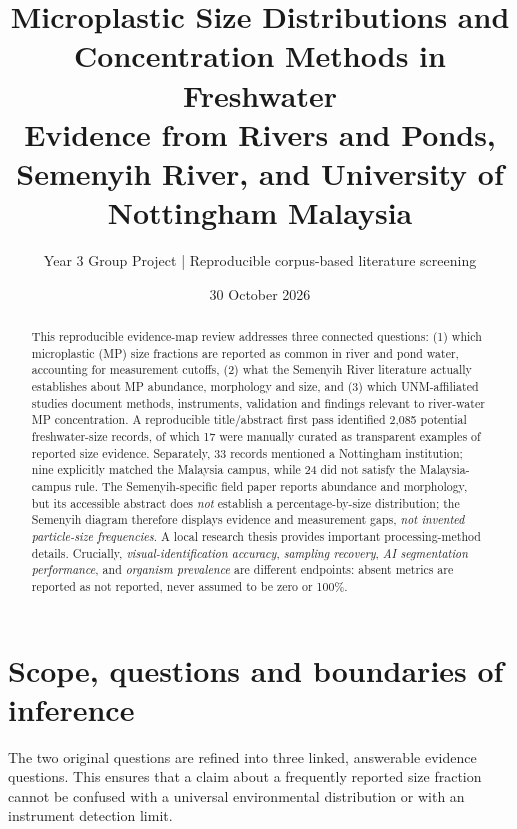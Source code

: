 \documentclass[10pt,a4paper]{article}
\title{\bfseries Microplastic Size Distributions and Concentration Methods in Freshwater\\[3mm]
\large Evidence from Rivers and Ponds, Semenyih River, and University of Nottingham Malaysia}
\author{Year 3 Group Project \quad | \quad Reproducible corpus-based literature screening}
\date{30 October 2026}
\begin{document}
\maketitle
\begin{abstract}
This reproducible evidence-map review addresses three connected questions: (1) which microplastic (MP) size fractions are reported as common in river and pond water, accounting for measurement cutoffs, (2) what the Semenyih River literature actually establishes about MP abundance, morphology and size, and (3) which UNM-affiliated studies document methods, instruments, validation and findings relevant to river-water MP concentration. A reproducible title/abstract first pass identified 2,085 potential freshwater-size records, of which 17 were manually curated as transparent examples of reported size evidence. Separately, 33 records mentioned a Nottingham institution; nine explicitly matched the Malaysia campus, while 24 did not satisfy the Malaysia-campus rule. The Semenyih-specific field paper reports abundance and morphology, but its accessible abstract does \emph{not} establish a percentage-by-size distribution; the Semenyih diagram therefore displays evidence and measurement gaps, \emph{not invented particle-size frequencies}. A local research thesis provides important processing-method details. Crucially, \emph{visual-identification accuracy}, \emph{sampling recovery}, \emph{AI segmentation performance}, and \emph{organism prevalence} are different endpoints: absent metrics are reported as not reported, never assumed to be zero or 100\%.
\end{abstract}
\clearpage
\begingroup\small\setlength{\parskip}{0pt}\tableofcontents\endgroup
\clearpage
\section{Scope, questions and boundaries of inference}
The two original questions are refined into three linked, answerable evidence questions. This ensures that a claim about a frequently reported size fraction cannot be confused with a universal environmental distribution or with an instrument detection limit.
\end{document}
